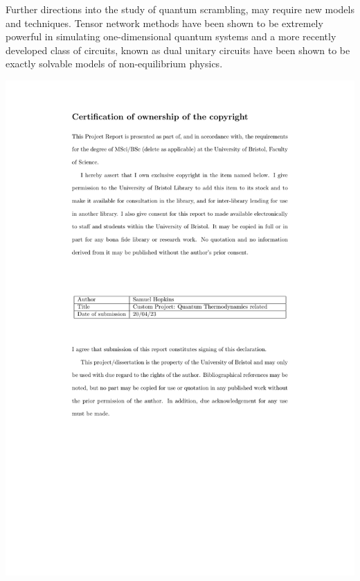 \documentclass[aps]{revtex4-2}
\begin{document}
Further directions into the study of quantum scrambling, may require new models and techniques. Tensor network methods have been shown to be extremely powerful in simulating one-dimensional quantum systems \cite{Xu_2019} and a more recently developed class of circuits, known as dual unitary circuits have been shown to be exactly solvable models of non-equilibrium physics\cite{Suzuki_2022}. 








\includegraphics[width = \textwidth]{certi.pdf}
\end{document}
